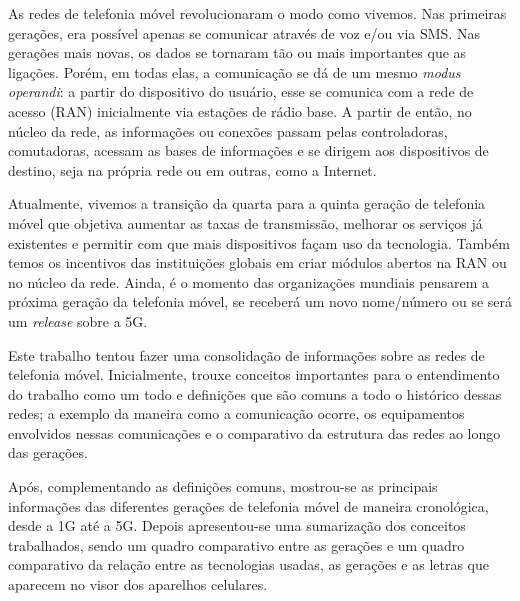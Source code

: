 \documentclass[11pt,oneside,a4paper]{abntex2}
\begin{document}
As redes de telefonia móvel revolucionaram o modo como vivemos. Nas primeiras gerações, era possível apenas se comunicar através de voz e/ou via SMS. Nas gerações mais novas, os dados se tornaram tão ou mais importantes que as ligações. Porém, em todas elas, a comunicação se dá de um mesmo \textit{modus operandi}: a partir do dispositivo do usuário, esse se comunica com a rede de acesso (RAN) inicialmente via estações de rádio base. A partir de então, no núcleo da rede, as informações ou conexões passam pelas controladoras, comutadoras, acessam as bases de informações e se dirigem aos dispositivos de destino, seja na própria rede ou em outras, como a Internet.

Atualmente, vivemos a transição da quarta para a quinta geração de telefonia móvel que objetiva aumentar as taxas de transmissão, melhorar os serviços já existentes e permitir com que mais dispositivos façam uso da tecnologia. Também temos os incentivos das instituições globais em criar módulos abertos na RAN ou no núcleo da rede. Ainda, é o momento das organizações mundiais pensarem a próxima geração da telefonia móvel, se receberá um novo nome/número ou se será um \textit{release} sobre a 5G.

Este trabalho tentou fazer uma consolidação de informações sobre as redes de telefonia móvel. Inicialmente, trouxe conceitos importantes para o entendimento do trabalho como um todo e definições que são comuns a todo o histórico dessas redes; a exemplo da maneira como a comunicação ocorre, os equipamentos envolvidos nessas comunicações e o comparativo da estrutura das redes ao longo das gerações.

Após, complementando as definições comuns, mostrou-se as principais informações das diferentes gerações de telefonia móvel de maneira cronológica, desde a 1G até a 5G. Depois apresentou-se uma sumarização dos conceitos trabalhados, sendo um quadro comparativo entre as gerações e um quadro comparativo da relação entre as tecnologias usadas, as gerações e as letras que aparecem no visor dos aparelhos celulares.


\label{biblio}
\end{document}
